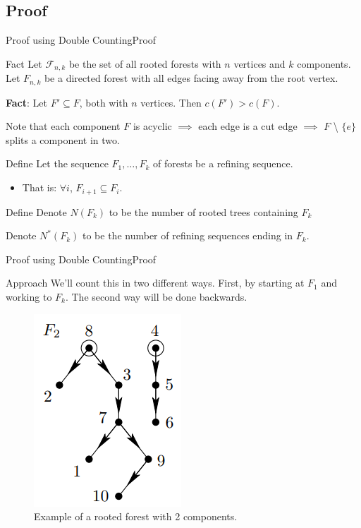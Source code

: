 \documentclass[10pt]{beamer}
\theoremstyle{definition}
\newcommand{\Stwo}{Proof using Double Counting}
\newcommand{\StwoSSproof}{Proof}
\begin{document}
\subsection{\StwoSSproof}
\begin{frame}{\Stwo}{\StwoSSproof}
\begin{block}{Fact}
Let $\mathcal{F}_{n,k}$ be the set of all rooted forests with $n$ vertices and $k$ components. Let $F_{n,k}$ be a directed forest with all edges facing away from the root vertex.

\textbf{Fact}: Let $F'\subseteq F$, both with $n$ vertices. Then $c(F')>c(F)$.

Note that each component $F$ is acyclic $\implies$ each edge is a cut edge $\implies$ $F$
\textbackslash{} $\{e\}$ splits a component in two.
\end{block}

\pause{}

\begin{block}{Define}
Let the sequence $F_{1},\ldots, F_{k}$ of forests be a refining sequence.
\begin{itemize}
  \item That is: $\forall i$, $F_{i+1}\subseteq F_{i}$.
\end{itemize}
\end{block}

\pause{}

\begin{block}{Define}
Denote $N(F_{k})$ to be the number of rooted trees containing $F_{k}$

Denote $N^{*}(F_{k})$ to be the number of refining sequences ending in $F_{k}$.
\end{block}

\end{frame}

\begin{frame}{\Stwo}{\StwoSSproof}

\begin{block}{Approach}
We'll count this in two different ways. First, by starting at $F_{1}$ and working to $F_{k}$. The second way will be done backwards.
\end{block}

\pause{}

\begin{figure}
  \includegraphics[width=0.3\linewidth]{images/section2_example.png}
  \caption{Example of a rooted forest with 2 components.}
  \label{fig:section2_example2}
\end{figure}

\end{frame}
\end{document}
